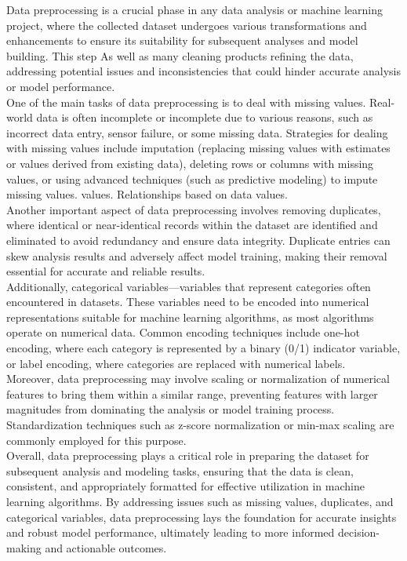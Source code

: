 \begin{description}
Data preprocessing is a crucial phase in any data analysis or machine learning project, where the collected dataset undergoes various transformations and enhancements to ensure its suitability for subsequent analyses and model building. This step As well as many cleaning products refining the data, addressing potential issues and inconsistencies that could hinder accurate analysis or model performance.
\\
One of the main tasks of data preprocessing is to deal with missing values. Real-world data is often incomplete or incomplete due to various reasons, such as incorrect data entry, sensor failure, or some missing data. Strategies for dealing with missing values include imputation (replacing missing values with estimates or values derived from existing data), deleting rows or columns with missing values, or using advanced techniques (such as predictive modeling) to impute missing values. values. Relationships based on data values.
\\
Another important aspect of data preprocessing involves removing duplicates, where identical or near-identical records within the dataset are identified and eliminated to avoid redundancy and ensure data integrity. Duplicate entries can skew analysis results and adversely affect model training, making their removal essential for accurate and reliable results.
\\
Additionally, categorical variables—variables that represent categories often encountered in datasets. These variables need to be encoded into numerical representations suitable for machine learning algorithms, as most algorithms operate on numerical data. Common encoding techniques include one-hot encoding, where each category is represented by a binary (0/1) indicator variable, or label encoding, where categories are replaced with numerical labels.
\\
Moreover, data preprocessing may involve scaling or normalization of numerical features to bring them within a similar range, preventing features with larger magnitudes from dominating the analysis or model training process. Standardization techniques such as z-score normalization or min-max scaling are commonly employed for this purpose.
\\
Overall, data preprocessing plays a critical role in preparing the dataset for subsequent analysis and modeling tasks, ensuring that the data is clean, consistent, and appropriately formatted for effective utilization in machine learning algorithms. By addressing issues such as missing values, duplicates, and categorical variables, data preprocessing lays the foundation for accurate insights and robust model performance, ultimately leading to more informed decision-making and actionable outcomes.

\end{description}
